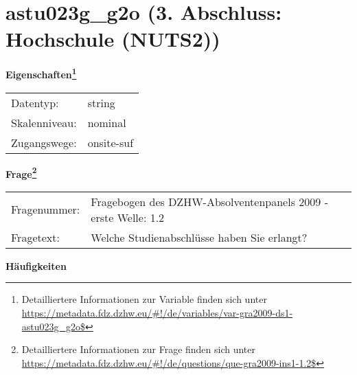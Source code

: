 
    \setcounter{footnote}{0}

    \vspace*{-1.8cm}
	\section{astu023g\_g2o (3. Abschluss: Hochschule (NUTS2))}
	\label{section:astu023g_g2o}



    \vspace*{0.5cm}
    \noindent\textbf{Eigenschaften\footnote{Detailliertere Informationen zur Variable finden sich unter
		\url{https://metadata.fdz.dzhw.eu/\#!/de/variables/var-gra2009-ds1-astu023g_g2o$}}}\\
	\begin{tabularx}{\hsize}{@{}lX}
	Datentyp: & string \\
	Skalenniveau: & nominal \\
	Zugangswege: &
	  onsite-suf
 \\
    \end{tabularx}



				\vspace*{0.5cm}
                \noindent\textbf{Frage\footnote{Detailliertere Informationen zur Frage finden sich unter
		              \url{https://metadata.fdz.dzhw.eu/\#!/de/questions/que-gra2009-ins1-1.2$}}}\\
				\begin{tabularx}{\hsize}{@{}lX}
					Fragenummer: &
					  Fragebogen des DZHW-Absolventenpanels 2009 - erste Welle:
					  1.2
 \\
					Fragetext: & Welche Studienabschlüsse haben Sie erlangt? \\
				\end{tabularx}





        		\vspace*{0.5cm}
                \noindent\textbf{Häufigkeiten}

